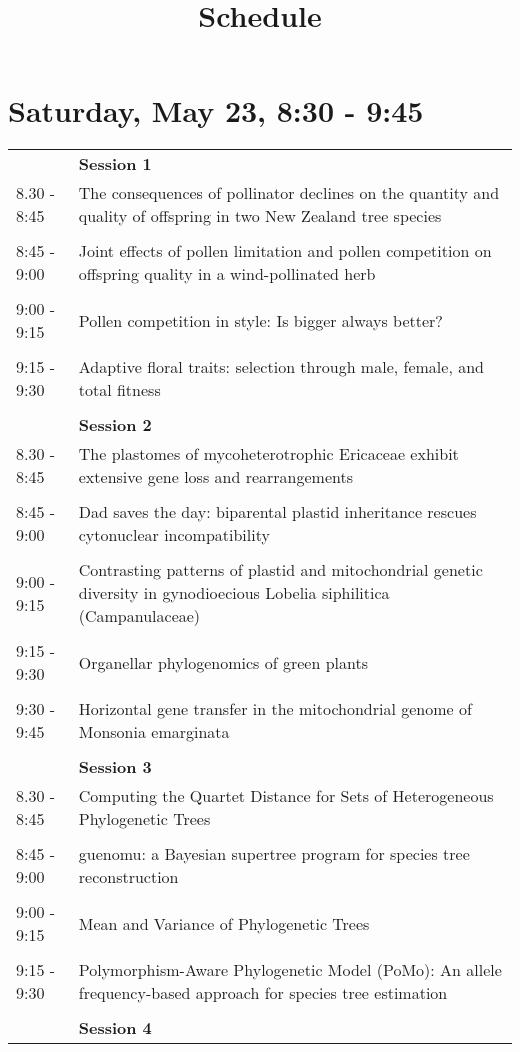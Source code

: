 \documentclass{article}
\title{Schedule}
\date{}
\begin{document}
\maketitle{}

\section{Saturday, May 23, 8:30 - 9:45}
\begin{longtabu} to \textwidth {lX}
 & \textbf{Session 1} \\ 

8.30 - 8:45 & The consequences of pollinator declines on the quantity and quality of offspring in two New Zealand tree species \\ 
 &  \\ 
8:45 - 9:00 & Joint effects of pollen limitation and pollen competition on offspring quality in a wind-pollinated herb \\ 
 &  \\ 
9:00 - 9:15 & Pollen competition in style: Is bigger always better? \\ 
 &  \\ 
9:15 - 9:30 & Adaptive floral traits: selection through male, female, and total fitness \\ 
 &  \\ 
 & \textbf{Session 2} \\ 

8.30 - 8:45 & The plastomes of mycoheterotrophic Ericaceae exhibit extensive gene loss and rearrangements \\ 
 &  \\ 
8:45 - 9:00 & Dad saves the day: biparental plastid inheritance rescues cytonuclear incompatibility \\ 
 &  \\ 
9:00 - 9:15 & Contrasting patterns of plastid and mitochondrial genetic diversity in gynodioecious Lobelia siphilitica (Campanulaceae) \\ 
 &  \\ 
9:15 - 9:30 & Organellar phylogenomics of green plants \\ 
 &  \\ 
9:30 - 9:45 & Horizontal gene transfer in the mitochondrial genome of Monsonia emarginata \\ 
 &  \\ 
 & \textbf{Session 3} \\ 

8.30 - 8:45 & Computing the Quartet Distance for Sets of Heterogeneous Phylogenetic Trees \\ 
 &  \\ 
8:45 - 9:00 & guenomu: a Bayesian supertree program for species tree reconstruction \\ 
 &  \\ 
9:00 - 9:15 & Mean and Variance of Phylogenetic Trees \\ 
 &  \\ 
9:15 - 9:30 & Polymorphism-Aware Phylogenetic Model (PoMo): An allele frequency-based approach for species tree estimation \\ 
 &  \\ 
 & \textbf{Session 4} \\ 


\end{longtabu}
\end{document}
